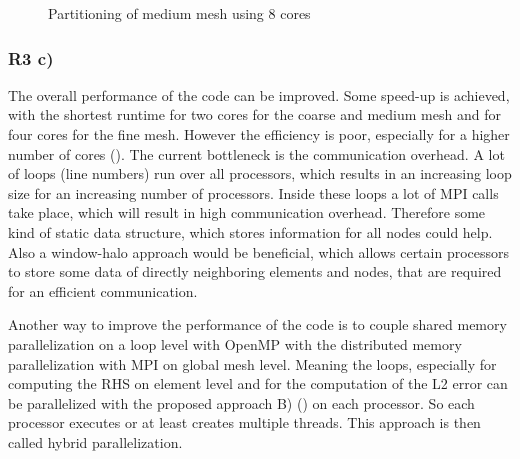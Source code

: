 \begin{figure}[h!]
	\centering
	\caption{\label{fig::partition} Partitioning of medium mesh using 8 cores}
\end{figure}

\subsubsection{R3 c)}

The overall performance of the code can be improved. Some speed-up is achieved, with the shortest runtime for two cores for the coarse and medium mesh and for four cores for the fine mesh. However the efficiency is poor, especially for a higher number of cores (). The current bottleneck is the communication overhead. A lot of loops (line numbers) run over all processors, which results in an increasing loop size for an increasing number of processors. Inside these loops a lot of MPI calls take place, which will result in high communication overhead. Therefore some kind of static data structure, which stores information for all nodes could help. Also a window-halo approach would be beneficial, which allows certain processors to store some data of directly neighboring elements and nodes, that are required for an efficient communication.

Another way to improve the performance of the code is to couple shared memory parallelization on a loop level with OpenMP with the distributed memory parallelization with MPI on global mesh level. Meaning the loops, especially for computing the RHS on element level and for the computation of the L2 error can be parallelized with the proposed approach B) () on each processor. So each processor executes or at least creates multiple threads. This approach is then called hybrid parallelization.

